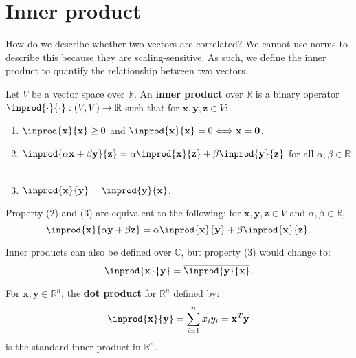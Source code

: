 \documentclass{huhtakm-template-book-v2}
\begin{document}
\section{Inner product}
    How do we describe whether two vectors are correlated? We cannot use norms to describe this because they are scaling-sensitive. As such, we define the inner product to quantify the relationship between two vectors.
    \begin{defn}
        Let $V$ be a vector space over $\mathbb{R}$. An \textbf{inner product} over $\mathbb{R}$ is a binary operator $\inprod{\cdot}{\cdot} : (V, V) \to \mathbb{R}$ such that for $\mathbf{x}, \mathbf{y}, \mathbf{z} \in V$:
        \begin{enumerate}
            \item $\inprod{\mathbf{x}}{\mathbf{x}} \geq 0$ and $\inprod{\mathbf{x}}{\mathbf{x}} = 0 \Longleftrightarrow \mathbf{x} = \mathbf{0}$.
            \item $\inprod{\alpha\mathbf{x} + \beta\mathbf{y}}{\mathbf{z}} = \alpha\inprod{\mathbf{x}}{\mathbf{z}} + \beta\inprod{\mathbf{y}}{\mathbf{z}}$ for all $\alpha, \beta \in \mathbb{R}$.
            \item $\inprod{\mathbf{x}}{\mathbf{y}} = \inprod{\mathbf{y}}{\mathbf{x}}$.
        \end{enumerate}
    \end{defn}
    \begin{rem}
        Property (2) and (3) are equivalent to the following: for $\mathbf{x}, \mathbf{y}, \mathbf{z} \in V$ and $\alpha, \beta \in \mathbb{R}$,
        \begin{equation*}
            \inprod{\mathbf{x}}{\alpha\mathbf{y} + \beta\mathbf{z}} = \alpha\inprod{\mathbf{x}}{\mathbf{y}} + \beta\inprod{\mathbf{x}}{\mathbf{z}}.
        \end{equation*}
    \end{rem}
    \begin{rem}
        Inner products can also be defined over $\mathbb{C}$, but property (3) would change to:
        \begin{equation*}
            \inprod{\mathbf{x}}{\mathbf{y}} = \overline{\inprod{\mathbf{y}}{\mathbf{x}}}.
        \end{equation*}
    \end{rem}
    \begin{eg}
        For $\mathbf{x}, \mathbf{y} \in \mathbb{R}^{n}$, the \textbf{dot product} for $\mathbb{R}^{n}$ defined by:
        \begin{equation*}
            \inprod{\mathbf{x}}{\mathbf{y}} = \sum_{i=1}^{n}x_{i}y_{i} = \mathbf{x}^{T}\mathbf{y}
        \end{equation*}
        is the standard inner product in $\mathbb{R}^{n}$.
    \end{eg}
\end{document}

